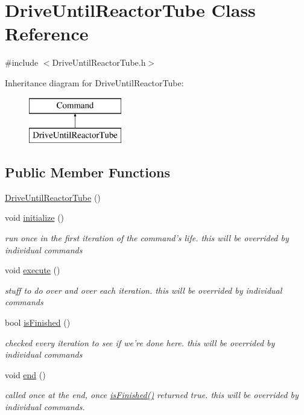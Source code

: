 \hypertarget{classDriveUntilReactorTube}{\section{Drive\-Until\-Reactor\-Tube Class Reference}
\label{classDriveUntilReactorTube}
}


{\ttfamily \#include $<$Drive\-Until\-Reactor\-Tube.\-h$>$}

Inheritance diagram for Drive\-Until\-Reactor\-Tube\-:\begin{figure}[H]
\begin{center}
\leavevmode
\includegraphics[height=2.000000cm]{classDriveUntilReactorTube}
\end{center}
\end{figure}
\subsection*{Public Member Functions}
\begin{DoxyCompactItemize}
\item 
\hyperlink{classDriveUntilReactorTube_acc0fbd9b892ddd9b0745fe5d14f050dd}{Drive\-Until\-Reactor\-Tube} ()
\item 
void \hyperlink{classDriveUntilReactorTube_af0c43c271f20406266ed1423bf6d980d}{initialize} ()
\begin{DoxyCompactList}\small\item\em run once in the first iteration of the command's life. this will be overrided by individual commands \end{DoxyCompactList}\item 
void \hyperlink{classDriveUntilReactorTube_a8d2c383dcf8e2424113cd6e546b58870}{execute} ()
\begin{DoxyCompactList}\small\item\em stuff to do over and over each iteration. this will be overrided by individual commands \end{DoxyCompactList}\item 
bool \hyperlink{classDriveUntilReactorTube_ab22da4688ca46cc3e33b1a7aca879a74}{is\-Finished} ()
\begin{DoxyCompactList}\small\item\em checked every iteration to see if we're done here. this will be overrided by individual commands \end{DoxyCompactList}\item 
void \hyperlink{classDriveUntilReactorTube_a34011a5721faf7cd169ac4e56f9c901b}{end} ()
\begin{DoxyCompactList}\small\item\em called once at the end, once \hyperlink{classDriveUntilReactorTube_ab22da4688ca46cc3e33b1a7aca879a74}{is\-Finished()} returned true. this will be overrided by individual commands. \end{DoxyCompactList}\end{DoxyCompactItemize}
